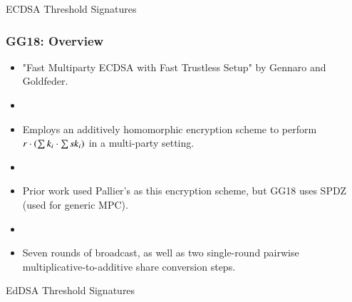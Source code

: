 \documentclass[hyperref={pdfpagelabels=true},table,dvipsnames,14pt,aspectratio=169]{beamer}
\begin{document}
\begin{frame}
  \huge 
  ECDSA Threshold Signatures
\end{frame}


\begin{frame}
  \frametitle{GG18: Overview}

  \begin{itemize}
    \item<1-> "Fast Multiparty ECDSA with Fast Trustless Setup" by Gennaro and Goldfeder. 
    \item[]
    \item<2-> Employs an additively homomorphic encryption scheme to perform $r \cdot (\sum k_i  \cdot \sum \mathit{sk}_i) $ in a multi-party setting. 
    \item[]
    \item<3-> Prior work used Pallier's as this encryption scheme, but GG18 uses SPDZ (used for generic MPC). 
    \item[]
    \item<4-> Seven rounds of broadcast, as well as two single-round pairwise multiplicative-to-additive share conversion steps. 
  \end{itemize}
\end{frame}

\begin{frame}
  \huge 
  EdDSA Threshold Signatures
\end{frame}
\end{document}
